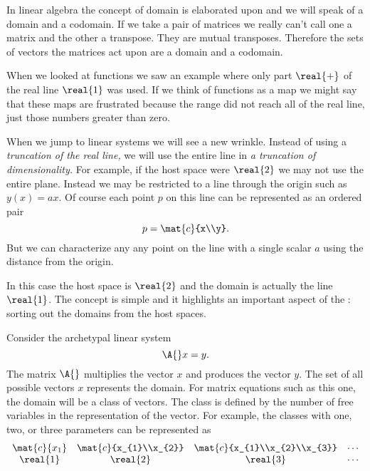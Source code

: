 In linear algebra the concept of domain is elaborated upon and we will speak of a domain and a codomain. If we take a pair of matrices we really can't call one a matrix and the other a transpose. They are mutual transposes. Therefore the sets of vectors the matrices act upon are a domain and a codomain.

When we looked at functions we saw an example where only part $\real{+}$ of the real line $\real{1}$ was used. If we think of functions as a map we might say that these maps are frustrated because the range did not reach all of the real line, just those numbers greater than zero.

When we jump to linear systems we will see a new wrinkle. Instead of using a \textit{truncation of the real line,} we will use the entire line in \textit{a truncation of dimensionality.} For example, if the host space were $\real{2}$ we may not use the entire plane. Instead we may be restricted to a line through the origin such as $y(x)=a x$. Of course each point $p$ on this line can be represented as an ordered pair 
\begin{equation}
  p = \mat{c}{x\\y}.
\end{equation}
But we can characterize any any point on the line  with a single scalar $a$ using the distance from the origin.

In this case the host space is $\real{2}$ and the domain is actually the line $\real{1}$. The concept is simple and it highlights an important aspect of the \svdl: sorting out the domains from the host spaces.

Consider the archetypal linear system
\begin{equation}
  \A{}x=y.
\end{equation}
The matrix $\A{}$ multiplies the vector $x$ and produces the vector $y$. The set of all possible vectors $x$ represents the domain. For matrix equations such as this one, the domain will be a class of vectors. The class is defined by the number of free variables in the representation of the vector. For example, the classes with one, two, or three parameters can be represented as
\begin{equation}
\begin{array}{cccc}
  \mat{c}{x_{1}} & \mat{c}{x_{1}\\x_{2}} & \mat{c}{x_{1}\\x_{2}\\x_{3}} & \cdots \\
  \real{1} & \real{2} & \real{3} & \cdots
  \label{eq:1:r}
\end{array}
\end{equation}

